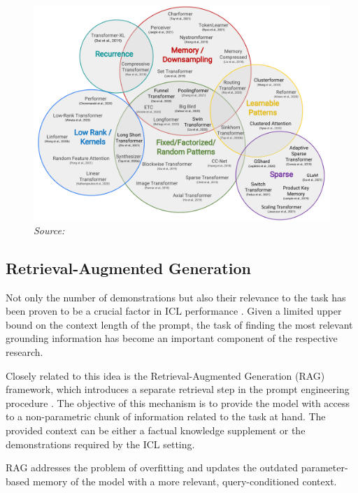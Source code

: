 \begin{figure}[ht]
    \centering
    \includegraphics[width=\textwidth]{figures/taxonomy-of-transformers.pdf}
    \label{fig:taxonomy-of-transformers}
    \hfill\textit{Source: \citet{tay2022}}
\end{figure}

\subsection{Retrieval-Augmented Generation}

Not only the number of demonstrations but also their relevance to the task has been proven to be a crucial factor in ICL performance \parencite{liu2021}. Given a limited upper bound on the context length of the prompt, the task of finding the most relevant grounding information has become an important component of the respective research.

Closely related to this idea is the Retrieval-Augmented Generation (RAG) framework, which introduces a separate retrieval step in the prompt engineering procedure \parencite{lewis2020}. The objective of this mechanism is to provide the model with access to a non-parametric chunk of information related to the task at hand. The provided context can be either a factual knowledge supplement or the demonstrations required by the ICL setting.

\newpage
\begin{sloppypar}
RAG addresses the problem of overfitting and updates the outdated parameter-based memory of the model with a more relevant, query-conditioned context.
\end{sloppypar}

